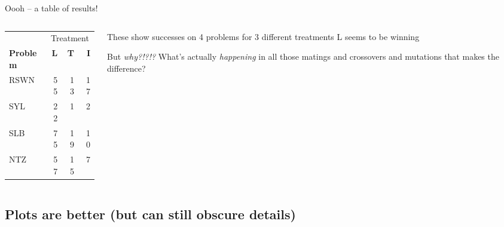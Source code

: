 \documentclass{beamer}
\newcommand{\linespace}{\vskip 0.25cm}
\begin{document}
\begin{frame}{Oooh -- a table of results!}

\begin{columns}
	\begin{column}{0.4 \linewidth}
		\centering
\begin{tabular}{lrrr}
	& \multicolumn{3}{c}{Treatment} \\ \cline{2-4}
	\textbf{Problem} & \textbf{L} & \textbf{T} & \textbf{I} \\
	\hline
	RSWN & 55 & 13 & 17 \\
	SYL & 22 & 1 & 2 \\
	SLB & 75 & 19 & 10 \\
	NTZ & 57 & 15 & 7
\end{tabular}
\end{column}

\begin{column}{0.55 \linewidth}
	\begin{overprint}
		These show successes on 4 problems for 3 different treatments
		\linespace
		L seems to be winning

		But \emph{why?!?!?}		
		\linespace
		What's actually \emph{happening} in all those matings and crossovers and mutations that makes the difference?
	\end{overprint}
\end{column}
\end{columns}
\end{frame}

\subsection{Plots are better (but can still obscure details)}
\end{document}
